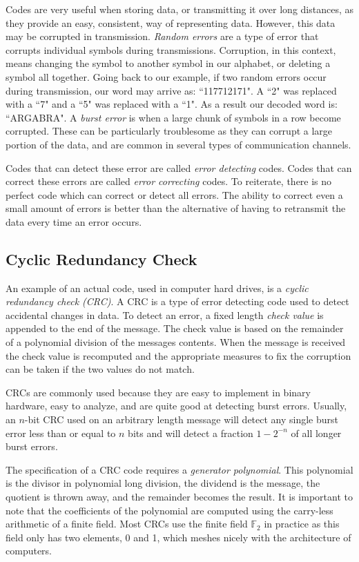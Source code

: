 \documentclass{article}
\begin{document}
Codes are very useful when storing data, or transmitting it over long distances, as they provide an easy, consistent, way of representing data. However, this data may be corrupted in transmission. \textit{Random errors} are a type of error that corrupts individual symbols during transmissions. Corruption, in this context, means changing the symbol to another symbol in our alphabet, or deleting a symbol all together. Going back to our example, if two random errors occur during transmission, our word may arrive as: ``117712171". A ``2" was replaced with a ``7" and a ``5" was replaced with a ``1". As a result our decoded word is: ``ARGABRA". A \textit{burst error} is when a large chunk of symbols in a row become corrupted. These can be particularly troublesome as they can corrupt a large portion of the data, and are common in several types of communication channels.

Codes that can detect these error are called \textit{error detecting} codes. Codes that can correct these errors are called \textit{error correcting} codes. To reiterate, there is no perfect code which can correct or detect all errors. The ability to correct even a small amount of errors is better than the alternative of having to retransmit the data every time an error occurs.

\subsection{Cyclic Redundancy Check}
An example of an actual code, used in computer hard drives, is a \textit{cyclic redundancy check (CRC)}. A CRC is a type of error detecting code used to detect accidental changes in data. To detect an error, a fixed length \textit{check value} is appended to the end of the message. The check value is based on the remainder of a polynomial division of the messages contents. When the message is received the check value is recomputed and the appropriate measures to fix the corruption can be taken if the two values do not match.

CRCs are commonly used because they are easy to implement in binary hardware, easy to analyze, and are quite good at detecting burst errors. Usually, an $n$-bit CRC used on an arbitrary length message will detect any single burst error less than or equal to $n$ bits and will detect a fraction $1 - 2^{-n}$ of all longer burst errors. 

The specification of a CRC code requires a \textit{generator polynomial}. This polynomial is the divisor in polynomial long division, the dividend is the message, the quotient is thrown away, and the remainder becomes the result. It is important to note that the coefficients of the polynomial are computed using the carry-less arithmetic of a 
finite field. Most CRCs use the finite field $\mathbb{F}_{2}$ in practice as this field only has two elements, 0 and 1, which meshes nicely with the architecture of computers.
\end{document}
